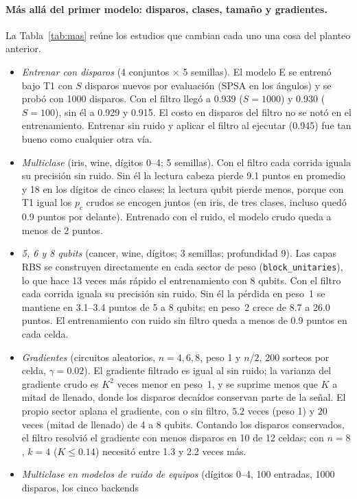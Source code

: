 \documentclass[11pt]{article}
\begin{document}
\paragraph{Más allá del primer modelo: disparos, clases, tamaño y gradientes.}\label{sec:mas}
La Tabla~\ref{tab:mas} reúne los estudios que cambian cada uno una cosa del planteo anterior.
\begin{itemize}
\item \textit{Entrenar con disparos} (4 conjuntos $\times$ 5 semillas). El modelo E se entrenó bajo T1 con $S$ disparos
  nuevos por evaluación (SPSA en los ángulos) y se probó con 1000 disparos. Con el filtro llegó a 0.939 ($S=1000$) y
  0.930 ($S=100$), sin él a 0.929 y 0.915. El costo en disparos del filtro no se notó en el entrenamiento. Entrenar
  sin ruido y aplicar el filtro al ejecutar (0.945) fue tan bueno como cualquier otra vía.
\item \textit{Multiclase} (iris, wine, dígitos 0--4; 5 semillas). Con el filtro cada corrida iguala su precisión sin
  ruido. Sin él la lectura cabeza pierde 9.1 puntos en promedio y 18 en los dígitos de cinco clases; la lectura qubit
  pierde menos, porque con T1 igual los $p_c$ crudos se encogen juntos (en iris, de tres clases, incluso quedó 0.9
  puntos por delante). Entrenado con el ruido, el modelo crudo queda a menos de 2 puntos.
\item \textit{5, 6 y 8 qubits} (cancer, wine, dígitos; 3 semillas; profundidad 9). Las capas RBS se construyen
  directamente en cada sector de peso (\texttt{block\_unitaries}), lo que hace 13 veces más rápido el entrenamiento con
  8 qubits. Con el filtro cada corrida iguala su precisión sin ruido. Sin él la pérdida en peso~1 se mantiene en
  3.1--3.4 puntos de 5 a 8 qubits; en peso~2 crece de 8.7 a 26.0 puntos. El entrenamiento con ruido sin filtro queda a
  menos de 0.9 puntos en cada celda.
\item \textit{Gradientes} (circuitos aleatorios, $n=4,6,8$, peso 1 y $n/2$, 200 sorteos por celda, $\gamma=0.02$). El
  gradiente filtrado es igual al sin ruido; la varianza del gradiente crudo es $K^2$ veces menor en peso~1, y se suprime
  menos que $K$ a mitad de llenado, donde los disparos decaídos conservan parte de la señal. El propio sector aplana el
  gradiente, con o sin filtro, $5.2$ veces (peso 1) y $20$ veces (mitad de llenado) de 4 a 8 qubits. Contando los
  disparos conservados, el filtro resolvió el gradiente con menos disparos en 10 de 12 celdas; con $n=8$, $k=4$
  ($K\le0.14$) necesitó entre 1.3 y 2.2 veces más.
\item \textit{Multiclase en modelos de ruido de equipos} (dígitos 0--4, 100 entradas, 1000 disparos, los cinco backends

\end{itemize}
\end{document}
